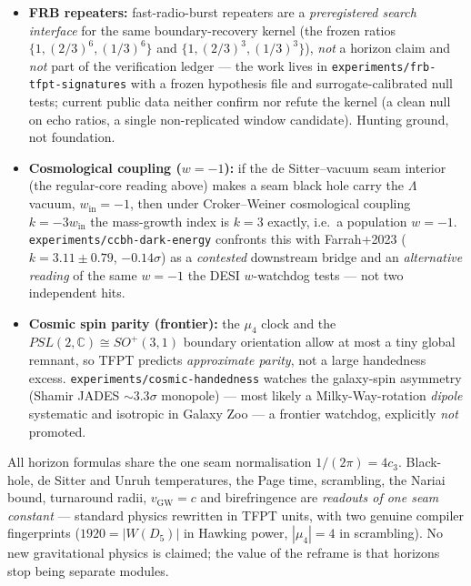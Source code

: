 \documentclass[11pt,a4paper]{article}
\newcommand{\cthree}{c_3}
\begin{document}
\begin{gapbox}
\begin{itemize}
$0.53$--$3.06\%$ --- in every source at or below the strength of the detected upper pair line. A
well-powered null: the ladder reading gains no support (GR resonance stays favored) but is not killed,
since the harmonic branch did not fire either (the published integer lines $92{=}184/2$, $34/68$\,Hz
stand). \texttt{experiments/hfqpo-ladder} carries the preregistered census, selection-null Monte Carlo
and the executed archival scan. A search ansatz, no prediction; even a future tooth hit would be \mC\
until the mapping is derived.
\item \textbf{FRB repeaters:} fast-radio-burst repeaters are a \emph{preregistered search interface} for
the same boundary-recovery kernel (the frozen ratios $\{1,(2/3)^6,(1/3)^6\}$ and $\{1,(2/3)^3,(1/3)^3\}$),
\emph{not} a horizon claim and \emph{not} part of the verification ledger --- the work lives in
\texttt{experiments/frb-tfpt-signatures} with a frozen hypothesis file and surrogate-calibrated null tests;
current public data neither confirm nor refute the kernel (a clean null on echo ratios, a single
non-replicated window candidate). Hunting ground, not foundation.
\item \textbf{Cosmological coupling ($w=-1$):} if the de Sitter--vacuum seam interior (the regular-core
reading above) makes a seam black hole carry the $\Lambda$ vacuum, $w_{\mathrm{in}}=-1$, then under
Croker--Weiner cosmological coupling $k=-3w_{\mathrm{in}}$ the mass-growth index is $k=3$ exactly, i.e.\ a
population $w=-1$. \texttt{experiments/ccbh-dark-energy} confronts this with Farrah+2023 ($k=3.11\pm0.79$,
$-0.14\sigma$) as a \emph{contested} downstream bridge and an \emph{alternative reading} of the same $w=-1$
the DESI $w$-watchdog tests --- not two independent hits.
\item \textbf{Cosmic spin parity (frontier):} the $\mu_4$ clock and the $PSL(2,\mathbb{C})\!\cong\!SO^+(3,1)$
boundary orientation allow at most a tiny global remnant, so TFPT predicts \emph{approximate parity}, not a
large handedness excess. \texttt{experiments/cosmic-handedness} watches the galaxy-spin asymmetry
(Shamir JADES $\sim3.3\sigma$ monopole) --- most likely a Milky-Way-rotation \emph{dipole} systematic and
isotropic in Galaxy Zoo --- a frontier watchdog, explicitly \emph{not} promoted.
\end{itemize}
\end{gapbox}

\begin{keybox}[Net]
All horizon formulas share the one seam normalisation $1/(2\pi)=4\cthree$. Black-hole, de Sitter and Unruh
temperatures, the Page time, scrambling, the Nariai bound, turnaround radii, $v_{\mathrm{GW}}=c$ and
birefringence are \emph{readouts of one seam constant} --- standard physics rewritten in TFPT units, with
two genuine compiler fingerprints ($1920=|W(D_5)|$ in Hawking power, $|\mu_4|=4$ in scrambling). No new
gravitational physics is claimed; the value of the reframe is that horizons stop being separate modules.
\end{keybox}
\end{document}
